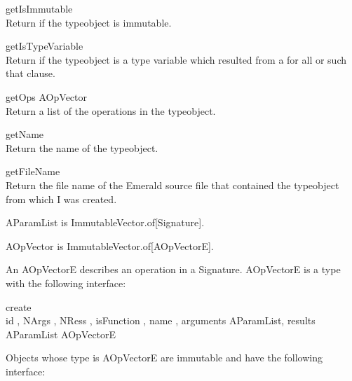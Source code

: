 \begin{desc}
  \item[\kw{function} getIsImmutable \returns{} \/\LB{}\tn{Boolean}\/\RB{}]~\\
    Return  if the typeobject is immutable.
  \item[\kw{function} getIsTypeVariable \returns{} \/\LB{}\tn{Boolean}\/\RB{}]~\\
    Return  if the typeobject is a type variable which resulted
    from a for all or such that clause.
  \item[\kw{function} getOps \returns{} \/\LB{}AOpVector\/\RB{}]~\\
    Return a list of the operations in the typeobject.      
  \item[\kw{function} getName \returns{} \/\LB{}\tn{String}\/\RB{}]~\\
    Return the name of the typeobject.
  \item[\kw{function} getFileName \returns{} \/\LB{}\tn{String}\/\RB{}]~\\
    Return the file name of the Emerald source file that contained the
    typeobject from which I was created.
\end{desc}

\label{builtin AParamList}
AParamList is ImmutableVector.of[Signature].

\label{builtin AOpVector}
AOpVector is ImmutableVector.of[AOpVectorE].

\label{builtin AOpVectorE}
An AOpVectorE describes an operation in a Signature.  AOpVectorE is a type with
the following interface: 

\begin{desc}
  \item[\kw{operation} create\/\LB{}]~\\
    id \CO{} ,
    NArgs \CO{} ,
    NRess \CO{} ,
    isFunction \CO{} ,
    name \CO{} ,
    arguments \CO{} AParamList,
    results \CO{} AParamList\/\RB{} \returns{} \/\LB{}AOpVectorE\/\RB{}
\end{desc}

Objects whose type is AOpVectorE are immutable and have the following
interface:

